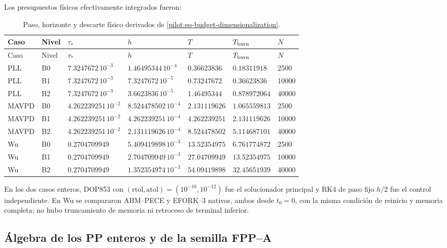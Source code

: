 Los presupuestos físicos efectivamente integrados fueron:
\begingroup
\tiny
\begin{longtable}{@{}L{1.8cm}C{0.7cm}C{2.05cm}C{2.15cm}C{2.15cm}C{1.8cm}C{1.1cm}@{}}
\caption{Paso, horizonte y descarte físico derivados de
\eqref{pilot:eq-budget-dimensionalization}.}
\label{pilot:tab-physical-budgets}\\
\toprule
Caso & Nivel & $\tau_*$ & $h$ & $T$ & $T_{\rm burn}$ & $N$\\
\midrule
\endfirsthead
\toprule
Caso & Nivel & $\tau_*$ & $h$ & $T$ & $T_{\rm burn}$ & $N$\\
\midrule
\endhead
PLL & B0 & $7.3247672\,10^{-3}$ & $1.46495344\,10^{-4}$ & $0.36623836$ & $0.18311918$ & 2500\\
PLL & B1 & $7.3247672\,10^{-3}$ & $7.3247672\,10^{-5}$ & $0.73247672$ & $0.36623836$ & 10000\\
PLL & B2 & $7.3247672\,10^{-3}$ & $3.6623836\,10^{-5}$ & $1.46495344$ & $0.878972064$ & 40000\\
MAVPD & B0 & $4.262239251\,10^{-2}$ & $8.524478502\,10^{-4}$ & $2.131119626$ & $1.065559813$ & 2500\\
MAVPD & B1 & $4.262239251\,10^{-2}$ & $4.262239251\,10^{-4}$ & $4.262239251$ & $2.131119626$ & 10000\\
MAVPD & B2 & $4.262239251\,10^{-2}$ & $2.131119626\,10^{-4}$ & $8.524478502$ & $5.114687101$ & 40000\\
Wu & B0 & $0.2704709949$ & $5.409419898\,10^{-3}$ & $13.52354975$ & $6.761774872$ & 2500\\
Wu & B1 & $0.2704709949$ & $2.704709949\,10^{-3}$ & $27.04709949$ & $13.52354975$ & 10000\\
Wu & B2 & $0.2704709949$ & $1.352354974\,10^{-3}$ & $54.09419898$ & $32.45651939$ & 40000\\
\bottomrule
\end{longtable}
\endgroup

En los dos casos enteros, DOP853 con
$(\mathrm{rtol},\mathrm{atol})=(10^{-10},10^{-12})$ fue el solucionador
principal y RK4 de paso fijo $h/2$ fue el control independiente. En Wu se
compararon ABM--PECE y EFORK--3 nativos, ambos desde $t_0=0$, con la misma
condición de reinicio y memoria completa; no hubo truncamiento de memoria ni
retroceso de terminal inferior.

\subsection{Álgebra de los PP enteros y de la semilla FPP--A}
\label{subsec:pilot-pp-algebra}


